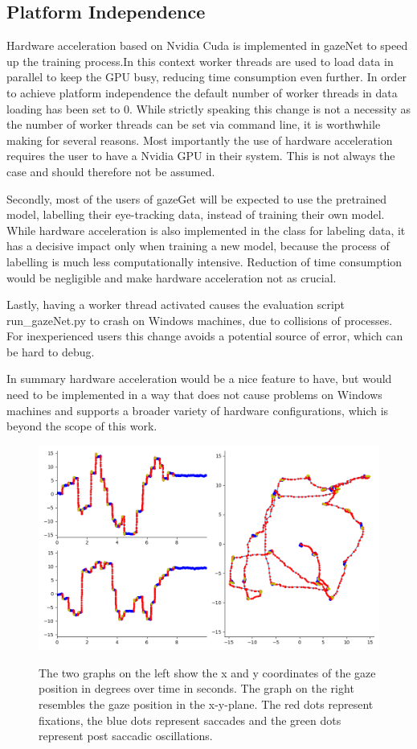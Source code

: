 \documentclass[conference]{IEEEtran}
\begin{document}
\subsection{Platform Independence}
Hardware acceleration based on Nvidia Cuda is implemented in gazeNet to speed up the training process.In this context worker threads are used to load data in parallel to keep the GPU busy, reducing time consumption even further. In order to achieve platform independence the default number of worker threads in data loading has been set to 0. While strictly speaking this change is not a necessity as the number of worker threads can be set via command line, it is worthwhile making for several reasons. Most importantly the use of hardware acceleration requires the user to have a Nvidia GPU in their system. This is not always the case and should therefore not be assumed.

Secondly, most of the users of gazeGet will be expected to use the pretrained model, labelling their eye-tracking data, instead of training their own model. While hardware acceleration is also implemented in the class for labeling data, it has a decisive impact only when training a new model, because the process of labelling is much less computationally intensive. Reduction of time consumption would be negligible and make hardware acceleration not as crucial.

Lastly, having a worker thread activated causes the evaluation script run\_gazeNet.py to crash on Windows machines, due to collisions of processes. For inexperienced users this change avoids a potential source of error, which can be hard to debug.

In summary hardware acceleration would be a nice feature to have, but would need to be implemented in a way that does not cause problems on Windows machines and supports a broader variety of hardware configurations, which is beyond the scope of this work.

\begin{figure}
    \centering
    \includegraphics[width=0.6\linewidth]
    {TH34_img_Europe_labelled_MN}
    \label{fig:lund2013}
    \caption{The two graphs on the left show the x and y coordinates of the gaze position in degrees over time in seconds. The graph on the right resembles the gaze position in the x-y-plane. The red dots represent fixations, the blue dots represent saccades and the green dots represent post saccadic oscillations.}
\end{figure}
\end{document}
